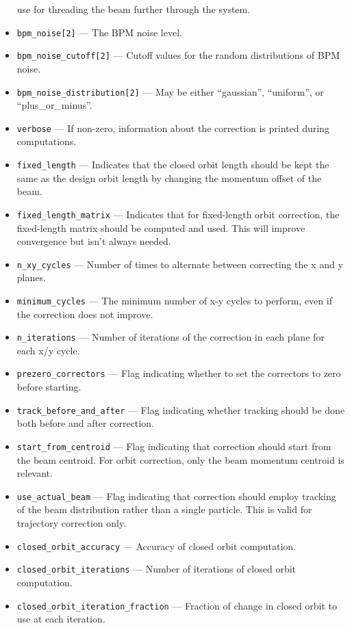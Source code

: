 \documentclass[11pt]{article}
\begin{document}
\begin{itemize}
  use for threading the beam further through the system.
\item \verb|bpm_noise[2]| --- The BPM noise level. 
\item \verb|bpm_noise_cutoff[2]| --- Cutoff values for the random distributions of BPM noise.
\item \verb|bpm_noise_distribution[2]| --- May be either ``gaussian'', ``uniform'', or ``plus\_or\_minus''.
\item \verb|verbose| --- If non-zero, information about the correction is printed during computations.
\item \verb|fixed_length| --- Indicates that the closed orbit length should be kept the same as the design orbit
length by changing the momentum offset of the beam.
\item \verb|fixed_length_matrix| --- Indicates that for fixed-length orbit correction, the fixed-length
matrix should be computed and used.  This will improve convergence but isn't always needed.
\item \verb|n_xy_cycles| --- Number of times to alternate between correcting the x and y planes.
\item \verb|minimum_cycles| --- The minimum number of x-y cycles to perform, even if the correction does not improve.
\item \verb|n_iterations| --- Number of iterations of the correction in each plane for each x/y cycle.
\item \verb|prezero_correctors| --- Flag indicating whether to set the correctors to zero before starting.
\item \verb|track_before_and_after| --- Flag indicating whether tracking should be done both before and after
correction.
\item \verb|start_from_centroid| --- Flag indicating that correction
should start from the beam centroid.  For orbit correction, only the
beam momentum centroid is relevant.
\item \verb|use_actual_beam| --- Flag indicating that correction
should employ tracking of the beam distribution rather than a single
particle.  This is valid for trajectory correction only.
\item \verb|closed_orbit_accuracy| --- Accuracy of closed orbit computation.
\item \verb|closed_orbit_iterations| --- Number of iterations of closed orbit computation.
\item \verb|closed_orbit_iteration_fraction| --- Fraction of change in closed orbit to
use at each iteration.

\end{itemize}
\end{document}
